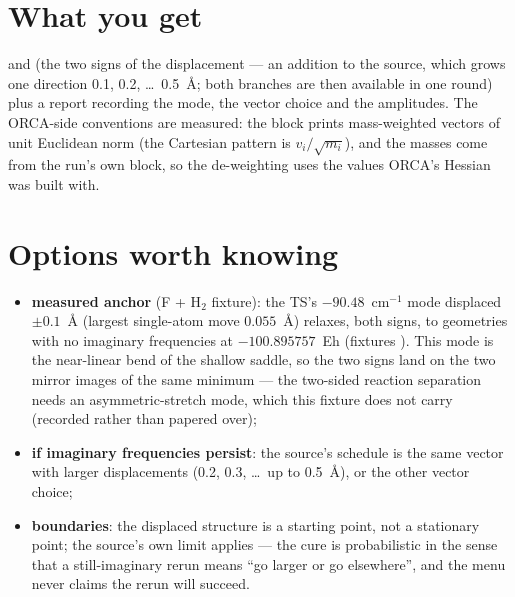 \section{What you get}

 and  (the two signs of
the displacement --- an addition to the source, which grows one direction
0.1, 0.2, \ldots\ 0.5~\AA; both branches are then available in one round)
plus a report  recording the mode, the vector
choice and the amplitudes.  The ORCA-side conventions are measured: the
 block prints mass-weighted vectors of unit Euclidean norm
(the Cartesian pattern is $v_i/\sqrt{m_i}$), and the masses come from the
run's own  block, so the de-weighting uses the values ORCA's
Hessian was built with.

\section{Options worth knowing}

\begin{readbox}
\begin{itemize}
  \item \textbf{measured anchor} (F + H$_2$ fixture): the TS's
    $-90.48$~cm$^{-1}$ mode displaced $\pm 0.1$~\AA{} (largest single-atom
    move $0.055$~\AA) relaxes, both signs, to geometries with no imaginary
    frequencies at $-100.895757$~Eh (fixtures ).  This
    mode is the near-linear bend of the shallow saddle, so the two signs
    land on the two mirror images of the same minimum --- the two-sided
    reaction separation needs an asymmetric-stretch mode, which this
    fixture does not carry (recorded rather than papered over);
  \item \textbf{if imaginary frequencies persist}: the source's schedule is
    the same vector with larger displacements (0.2, 0.3, \ldots\ up to
    0.5~\AA), or the other vector choice;
  \item \textbf{boundaries}: the displaced structure is a starting point,
    not a stationary point; the source's own limit applies --- the cure is
    probabilistic in the sense that a still-imaginary rerun means ``go
    larger or go elsewhere'', and the menu never claims the rerun will
    succeed.
\end{itemize}
\end{readbox}
